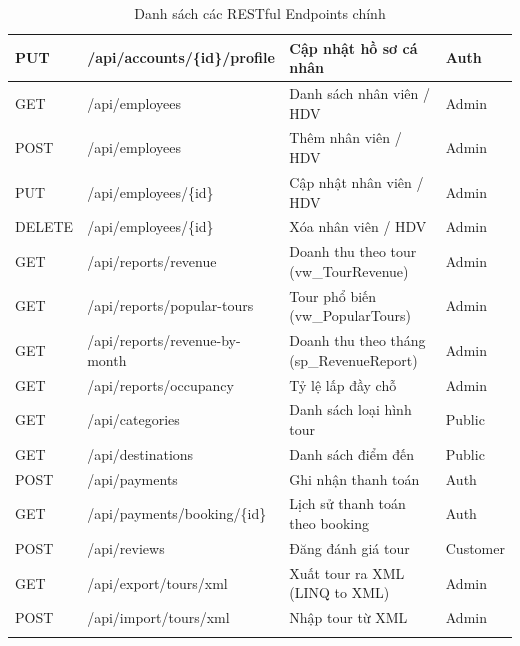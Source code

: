 \begin{longtable}{|l|p{6cm}|p{4.2cm}|l|}
  PUT    & /api/accounts/\{id\}/profile                   & Cập nhật hồ sơ cá nhân                   & Auth     \\ \hline
  GET    & /api/employees                                 & Danh sách nhân viên / HDV                 & Admin    \\ \hline
  POST   & /api/employees                                 & Thêm nhân viên / HDV                      & Admin    \\ \hline
  PUT    & /api/employees/\{id\}                          & Cập nhật nhân viên / HDV                  & Admin    \\ \hline
  DELETE & /api/employees/\{id\}                          & Xóa nhân viên / HDV                       & Admin    \\ \hline
  GET    & /api/reports/revenue                           & Doanh thu theo tour (vw\_TourRevenue)     & Admin    \\ \hline
  GET    & /api/reports/popular-tours                     & Tour phổ biến (vw\_PopularTours)          & Admin    \\ \hline
  GET    & /api/reports/revenue-by-month                  & Doanh thu theo tháng (sp\_RevenueReport)  & Admin    \\ \hline
  GET    & /api/reports/occupancy                         & Tỷ lệ lấp đầy chỗ                         & Admin    \\ \hline
  GET    & /api/categories                                & Danh sách loại hình tour                  & Public   \\ \hline
  GET    & /api/destinations                              & Danh sách điểm đến                        & Public   \\ \hline
  POST   & /api/payments                                  & Ghi nhận thanh toán                       & Auth     \\ \hline
  GET    & /api/payments/booking/\{id\}                   & Lịch sử thanh toán theo booking           & Auth     \\ \hline
  POST   & /api/reviews                                   & Đăng đánh giá tour                        & Customer \\ \hline
  GET    & /api/export/tours/xml                          & Xuất tour ra XML (LINQ to XML)            & Admin    \\ \hline
  POST   & /api/import/tours/xml                          & Nhập tour từ XML                          & Admin    \\
  \hline
  \caption{Danh sách các RESTful Endpoints chính}\label{table:endpoints}
\end{longtable}

